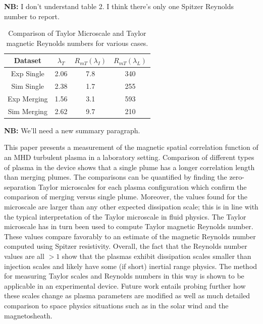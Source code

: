 \documentclass[aip,prl,amsmath,amssymb,reprint,superscriptaddress]{revtex4-1} %
\begin{document}
{\bf NB:} I don't understand table 2.  I think there's only one Spitzer Reynolds number to report.

\begin{table} [htbp]
\caption{\label{tab:Rms1}Comparison of Taylor Microscale and Taylor magnetic Reynolds numbers for various cases.}
\begin{tabular}{cccc}
\toprule
Dataset								& $\lambda_{T}$	&$R_{mT}(\lambda_{I})$&$R_{mT}(\lambda_L)$\\
\hline
Exp Single  					& 2.06 					& 7.8 								& 340\\					%
Sim Single  					& 2.38 					& 1.7 								& 255\\					%
Exp Merging 					& 1.56 					& 3.1 								& 593\\					%
Sim Merging 					& 2.62 					& 9.7 								& 210\\					%
\hline
\end{tabular}
\end{table}

{\bf NB:}  We'll need a new summary paragraph.

This paper presents a measurement of the magnetic spatial correlation function of an MHD turbulent plasma in a laboratory setting. Comparison of different types of plasma in the device shows that a single plume has a longer correlation length than merging plumes. The comparisons can be quantified by finding the zero-separation Taylor microscales for each plasma configuration which confirm the comparison of merging versus single plume. Moreover, the values found for the microscale are larger than any other expected dissipation scale; this is in line with the typical interpretation of the Taylor microscale in fluid physics. The Taylor microscale has in turn been used to compute Taylor magnetic Reynolds number. These values compare favorably to an estimate of the magnetic Reynolds number computed using Spitzer resistivity. Overall, the fact that the Reynolds number values are all $> 1$ show that the plasmas exhibit dissipation scales smaller than injection scales and likely have some (if short) inertial range physics. The method for measuring Taylor scales and Reynolds numbers in this way is shown to be applicable in an experimental device. Future work entails probing further how these scales change as plasma parameters are modified as well as much detailed comparison to space physics situations such as in the solar wind and the magnetosheath.
\end{document}
